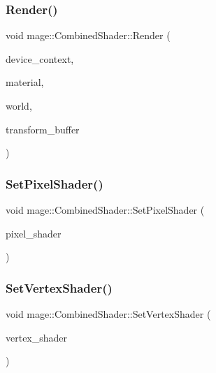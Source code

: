 \subsubsection{\texorpdfstring{Render()}{Render()}}
{\footnotesize\ttfamily void mage\+::\+Combined\+Shader\+::\+Render (\begin{DoxyParamCaption}\item[{I\+D3\+D11\+Device\+Context2 \&}]{device\+\_\+context,  }\item[{const \hyperlink{structmage_1_1_material}{Material} \&}]{material,  }\item[{const \hyperlink{classmage_1_1_world}{World} \&}]{world,  }\item[{const \hyperlink{structmage_1_1_transform_buffer}{Transform\+Buffer} \&}]{transform\+\_\+buffer }\end{DoxyParamCaption})}

\hypertarget{structmage_1_1_combined_shader_a0d6c2bd58066a423a90cf8368e0a2d66}{}\label{structmage_1_1_combined_shader_a0d6c2bd58066a423a90cf8368e0a2d66} 
\subsubsection{\texorpdfstring{Set\+Pixel\+Shader()}{SetPixelShader()}}
{\footnotesize\ttfamily void mage\+::\+Combined\+Shader\+::\+Set\+Pixel\+Shader (\begin{DoxyParamCaption}\item[{\hyperlink{namespacemage_a1e01ae66713838a7a67d30e44c67703e}{Shared\+Ptr}$<$ \hyperlink{classmage_1_1_pixel_shader}{Pixel\+Shader} $>$}]{pixel\+\_\+shader }\end{DoxyParamCaption})}

\hypertarget{structmage_1_1_combined_shader_a9c7c71b12847cec8cffc4f909b84a50a}{}\label{structmage_1_1_combined_shader_a9c7c71b12847cec8cffc4f909b84a50a} 
\subsubsection{\texorpdfstring{Set\+Vertex\+Shader()}{SetVertexShader()}}
{\footnotesize\ttfamily void mage\+::\+Combined\+Shader\+::\+Set\+Vertex\+Shader (\begin{DoxyParamCaption}\item[{\hyperlink{namespacemage_a1e01ae66713838a7a67d30e44c67703e}{Shared\+Ptr}$<$ \hyperlink{classmage_1_1_vertex_shader}{Vertex\+Shader} $>$}]{vertex\+\_\+shader }\end{DoxyParamCaption})}



